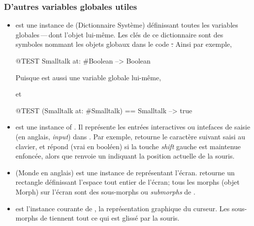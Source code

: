 \documentclass[a4paper,10pt,twoside]{book}
\begin{document}

\subsubsection{D'autres variables globales utiles}

\begin{itemize}
\item
{} est une instance de  (Dictionnaire Syst\`eme) d\'efinissant toutes les variables globales\,---\,dont l'objet  lui-m\^eme.   
Les cl\'es de ce dictionnaire sont des symboles nommant les objets globaux dans le code \st.
Ainsi par exemple,
\begin{code}{@TEST}
Smalltalk at: #Boolean --> Boolean
\end{code}
Puisque  est aussi une variable globale lui-m\^eme,
\begin{code}{}
Smalltalk at: #Smalltalk-->a SystemDictionary(lots of globals)}
\end{code} 
et
\begin{code}{@TEST}
(Smalltalk at: #Smalltalk) == Smalltalk --> true
\end{code}

\item {} est une instance of . Il repr\'esente les entr\'ees interactives ou intefaces de saisie (en anglais, \emph{input}) dans \squeak.
Par exemple,  retourne le caract\`ere suivant saisi au clavier, et  r\'epond  (vrai en bool\'een) si la
touche \emph{shift} gauche est maintenue enfonc\'ee, alors que  renvoie un  indiquant la position actuelle de la souris.

\item {} (Monde en anglais) est une instance de  repr\'esentant l'\'ecran.
 retourne un rectangle d\'efinissant l'espace tout entier de l'\'ecran; tous les morphs (objet Morph) sur l'\'ecran sont des sous-morphs ou \emph{submorphs} de .

\item {} est l'instance courante de , la repr\'esentation graphique du curseur. Les sous-morphs de  tiennent tout ce qui est gliss\'e par la souris.


\end{itemize}
\end{document}
